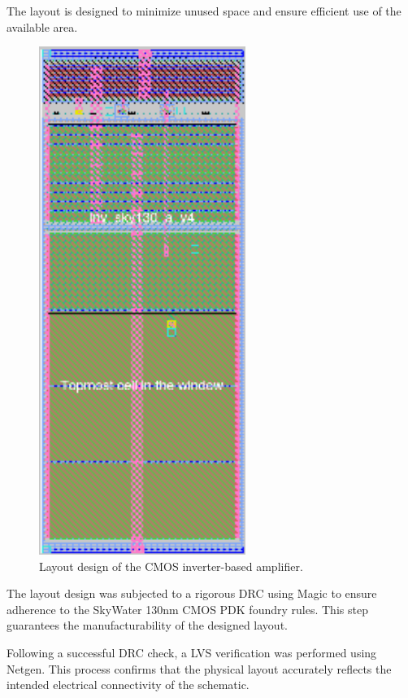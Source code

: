 The layout is designed to minimize unused space and ensure efficient use of the available area.

\begin{figure}[ht!]
\centering
\includegraphics[width=0.6\textwidth]{Figures/final_layout.png}
\caption{Layout design of the CMOS inverter-based amplifier.}
\label{fig:layout_v4}
\end{figure}

The layout design was subjected to a rigorous DRC using Magic to ensure adherence to the SkyWater 130nm CMOS PDK foundry rules. 
This step guarantees the manufacturability of the designed layout.

Following a successful DRC check, a LVS verification was performed using Netgen. 
This process confirms that the physical layout accurately reflects the intended electrical connectivity of the schematic.

